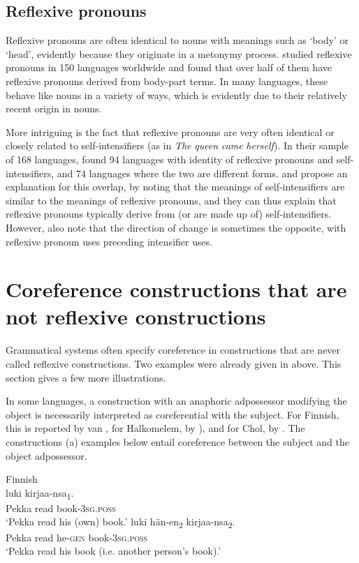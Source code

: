 \documentclass[output=paper]{langscibook}
\begin{document}
\subsection{Reflexive pronouns}\label{sec:Haspelmath:11.2}
Reflexive pronouns are often identical to nouns with meanings such as ‘body’ or ‘head’, evidently because they originate in a metonymy process. \citet{Schladt1999} studied reflexive pronouns in 150 languages worldwide and found that over half of them have reflexive pronouns derived from body-part terms. In many languages, these behave like nouns in a variety of ways, which is evidently due to their relatively recent origin in nouns. 

  More intriguing is the fact that reflexive pronouns are very often identical or closely related to self-intensifiers (as in \textit{The} \textit{queen} \textit{came} \textit{herself}). In their sample of 168 languages, \citet{KoenigEtAl2005} found 94 languages with identity of reflexive pronouns and self-intensifiers, and 74 languages where the two are different forms. \citet{KoenigSiemund1999} and \citet{KoenigGast2006} propose an explanation for this overlap, by noting that the meanings of self-intensifiers are similar to the meanings of reflexive pronouns, and they can thus explain that reflexive pronouns typically derive from (or are made up of) self-intensifiers. However, \citet{GastSiemund2006} also note that the direction of change is sometimes the opposite, with reflexive pronoun uses preceding intensifier uses.

\section{Coreference constructions that are not reflexive constructions}\label{sec:Haspelmath:12}
Grammatical systems often specify coreference in constructions that are never called reflexive constructions. Two examples were already given in  above. This section gives a few more illustrations.

  In some languages, a construction with an anaphoric adpossessor modifying the object is necessarily interpreted as coreferential with the subject. For Finnish, this is reported by van \citet[232]{Steenbergen1991}, for Halkomelem, by \citealt[\S6]{DéchaineWiltschko2017a}), and for Chol, by \citet[53--54]{Coon2011}. The constructions (a) examples below entail coreference between the subject and the object adpossessor.

\ea%
    Finnish\label{ex:Haspelmath:52}\\
   \ea 
      {luki}  {kirjaa-nsa\textsubscript{1}}.\\
     Pekka  read  book-\textsc{3sg.poss}   \\
    \glt‘Pekka read his (own) book.’
      {luki}  {hän-en\textsubscript{2}}  {kirjaa-nsa\textsubscript{2}}.\\
    Pekka  read  he-\textsc{gen}  book-\textsc{3sg.poss}\\
    \glt ‘Pekka read his book (i.e. another person’s book).’
    \z
\z 
\end{document}
